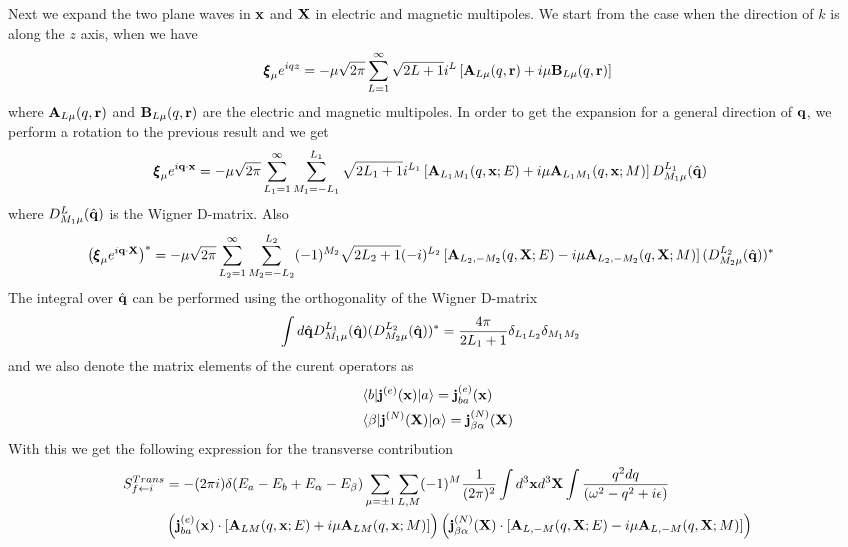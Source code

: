 Next  we expand the two plane waves in ${\bf x}$ and ${\bf X}$ in electric and magnetic multipoles.
We start from  the case when the direction of $k$ is along the $z$ axis, when we have
\begin{align}
    {\pmb \xi}_\mu e^{iqz} = -\mu \sqrt{2\pi} \sum\limits_{L=1}^{\infty} \sqrt{2L+1} i^L \left[{\bf A}_{L\mu}(q,{\bf r}) + i\mu {\bf B}_{L\mu}(q,{\bf r})\right]
\end{align}
where ${\bf A}_{L\mu}(q,{\bf r})$ and ${\bf B}_{L\mu}(q,{\bf r})$ are the electric and magnetic multipoles. In order to get the expansion for a general direction of ${\bf q}$, we perform a rotation to the previous result and we get
\begin{align}
    {\pmb \xi}_\mu e^{i{\bf q}\cdot{\bf x}} & = -\mu \sqrt{2\pi} \sum\limits_{L_1=1}^{\infty} \sum\limits_{M_1=-L_1}^{L_1} \sqrt{2L_1+1} i^{L_1} \left[{\bf A}_{L_1M_1}(q,{\bf x};E) + i\mu {\bf A}_{L_1M_1}(q,{\bf x};M)\right] D^{L_1}_{M_1 \mu}(\hat{\bf q})
\end{align}
where $D^L_{M_1 \mu}(\hat{\bf q})$ is the Wigner D-matrix.
Also
\begin{align}
    \left({\pmb \xi}_\mu e^{i{\bf q}\cdot{\bf X}}\right)^* & = -\mu \sqrt{2\pi} \sum\limits_{L_2=1}^{\infty} \sum\limits_{M_2=-L_2}^{L_2} (-1)^{M_2}\sqrt{2L_2+1} (-i)^{L_2} \left[{\bf A}_{L_2,-M_2}(q,{\bf X};E) - i\mu {\bf A}_{L_2,-M_2}(q,{\bf X};M)\right] (D^{L_2}_{M_2 \mu}(\hat{\bf q}))^*
\end{align}
The integral over $\hat{\bf q}$ can be performed using the orthogonality of the Wigner D-matrix
\begin{align}
    \int d{\hat{\bf q}} D^{L_1}_{M_1 \mu}(\hat{\bf q}) (D^{L_2}_{M_2 \mu}(\hat{\bf q}))^* & = \frac{4\pi}{2L_1+1}\delta_{L_1 L_2}\delta_{M_1 M_2}
\end{align}
and we also denote the matrix elements of the curent operators as
\begin{align}
     & \langle b|{\bf j}^{(e)}({\bf x})|a \rangle = {\bf j}^{(e)}_{ba}({\bf x})                   \\
     & \langle \beta|{\bf j}^{(N)}({\bf X})|\alpha \rangle = {\bf j}^{(N)}_{\beta\alpha}({\bf X}) \\
\end{align}
With this we get the following expression for the transverse contribution
\begin{align}
    S_{f\leftarrow i}^{Trans} & = -(2\pi i)\delta(E_a-E_{b}+E_\alpha-E_{\beta})  \sum\limits_{\mu = \pm1} \sum\limits_{L,M} (-1)^M\frac1{(2\pi)^2} \int d^3{\bf x} d^3{\bf X} \int \frac{q^2 dq}{(\omega^2 -{ q}^2+ i\epsilon)}\nonumber                                                 \\
                              & \left({\bf j}^{(e)}_{ba}({\bf x})\cdot\left[{\bf A}_{LM}(q,{\bf x};E) + i\mu {\bf A}_{LM}(q,{\bf x};M)\right]\right) \left({\bf j}^{(N)}_{\beta\alpha}({\bf X}) \cdot \left[{\bf A}_{L,-M}(q,{\bf X};E) - i\mu {\bf A}_{L,-M}(q,{\bf X};M)\right]\right)
\end{align}
